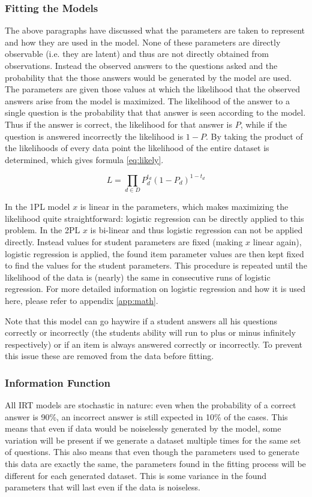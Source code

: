 \documentclass{scrartcl}
\begin{document}
\subsubsection{Fitting the Models}
The above paragraphs have discussed what the parameters are taken to represent and how they are used in the model. None of these parameters are directly observable (i.e. they are latent) and thus are not directly obtained from observations. Instead the observed answers to the questions asked and the probability that the those answers would be generated by the model are used. The parameters are given those values at which the likelihood that the observed answers arise from the model is maximized. The likelihood of the answer to a single question is the probability that that answer is seen according to the model. Thus if the answer is correct, the likelihood for that answer is $P$, while if the question is answered incorrectly the likelihood is $1-P$. By taking the product of the likelihoods of every data point the likelihood of the entire dataset is determined, which gives formula \ref{eq:likely}.

\begin{equation}
\label{eq:likely}
L=\prod_{d \in D} P_{d}^{t_d}  (1- P_{d})^{1-t_d}
\end{equation}

In the 1PL model $x$ is linear in the parameters, which makes maximizing the likelihood quite straightforward: logistic regression can be directly applied to this problem. In the 2PL $x$ is bi-linear and thus logistic regression can not be applied directly. Instead values for student parameters are fixed (making $x$ linear again), logistic regression is applied, the found item parameter values are then kept fixed to find the values for the student parameters. This procedure is repeated until the likelihood of the data is (nearly) the same in consecutive runs of logistic regression. For more detailed information on logistic regression and how it is used here, please refer to appendix \ref{app:math}.

Note that this model can go haywire if a student answers all his questions correctly or incorrectly (the students ability will run to plus or minus infinitely respectively) or if an item is always answered correctly  or incorrectly. To prevent this issue these are removed from the data before fitting.

\subsubsection{Information Function}
\label{sec:inherent}
All IRT models are stochastic in nature: even when the probability of a correct answer is 90\%, an incorrect answer is still expected in 10\% of the cases. This means that even if data would be noiselessly generated by the model, some variation will be present if we generate a dataset multiple times for the same set of questions. This also means that even though the parameters used to generate this data are exactly the same, the parameters found in the fitting process will be different for each generated dataset. This is some variance in the found parameters that will last even if the data is noiseless.  
\end{document}
